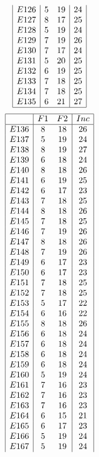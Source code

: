 \documentclass[12pt]{article}
\begin{document}
\begin{multicols}{3}
\begin{equation*}
\begin{array}{|c|cc|c|}
E126&5&19&24\\
E127&8&17&25\\
E128&5&19&24\\
E129&7&19&26\\
E130&7&17&24\\
E131&5&20&25\\
E132&6&19&25\\
E133&7&18&25\\
E134&7&18&25\\
E135&6&21&27\\
\hline
\end{array}
\end{equation*}
\begin{equation*}
\begin{array}{|c|cc|c|}
\hline
&F1&F2&Inc\\
\hline
E136&8&18&26\\
E137&5&19&24\\
E138&8&19&27\\
E139&6&18&24\\
E140&8&18&26\\
E141&6&19&25\\
E142&6&17&23\\
E143&7&18&25\\
E144&8&18&26\\
E145&7&18&25\\
E146&7&19&26\\
E147&8&18&26\\
E148&7&19&26\\
E149&6&17&23\\
E150&6&17&23\\
E151&7&18&25\\
E152&7&18&25\\
E153&5&17&22\\
E154&6&16&22\\
E155&8&18&26\\
E156&6&18&24\\
E157&6&18&24\\
E158&6&18&24\\
E159&6&18&24\\
E160&5&19&24\\
E161&7&16&23\\
E162&7&16&23\\
E163&7&16&23\\
E164&6&15&21\\
E165&6&17&23\\
E166&5&19&24\\
E167&5&19&24\\

\end{array}
\end{equation*}
\end{multicols}
\end{document}
